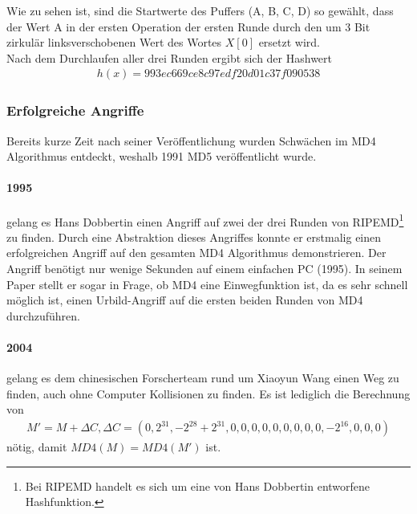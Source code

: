 \documentclass[12pt,a4paper]{scrartcl}
\numberwithin{equation}{section}
\numberwithin{myalgctr}{section}
\numberwithin{mytheoremctr}{section}
\newcommand{\mpar}[1]{\paragraph*{#1}\mbox{}\par}
\begin{document}
	\par\noindent
	Wie zu sehen ist, sind die Startwerte des Puffers (A, B, C, D) so gewählt, dass der Wert A in der ersten Operation der ersten Runde durch den um 3 Bit zirkulär linksverschobenen Wert des Wortes $X[0]$  ersetzt wird.\\ Nach dem Durchlaufen aller drei Runden ergibt sich der Hashwert 
	\begin{align*}
		h(x)=993ec669ce8c97edf20d01c37f090538
	\end{align*} 
	
	
	
		
		
	\subsubsection{Erfolgreiche Angriffe}
	Bereits kurze Zeit nach seiner Veröffentlichung wurden Schwächen im MD4 Algorithmus entdeckt, weshalb 1991 MD5 veröffentlicht wurde.
	\mpar{1995} gelang es Hans Dobbertin einen Angriff auf zwei der drei Runden von RIPEMD\footnote{Bei RIPEMD handelt es sich um eine von Hans Dobbertin entworfene Hashfunktion.} zu finden.  Durch eine Abstraktion dieses Angriffes konnte er erstmalig einen erfolgreichen Angriff auf den gesamten MD4 Algorithmus demonstrieren. Der Angriff benötigt nur wenige Sekunden auf einem einfachen PC (1995). In seinem Paper stellt er sogar in Frage, ob MD4 eine Einwegfunktion ist, da es sehr schnell möglich ist, einen Urbild-Angriff auf die ersten beiden Runden von MD4 durchzuführen.\autocite[vgl.][1]{dobbertin}
	\mpar{2004} gelang es dem chinesischen Forscherteam rund um Xiaoyun Wang einen Weg zu finden, auch ohne Computer Kollisionen zu finden. Es ist lediglich die Berechnung von
	\begin{align*}
		M' = M + \Delta C, \Delta C = (0,2^{31},-2^{28}+2^{31},0,0,0,0,0,0,0,0,0,-2^{16},0,0,0)
	\end{align*}
	nötig, damit $MD4(M) = MD4(M')$ ist.\autocite[vgl.][3]{md4Collision}\\
	\noindent
\end{document}
